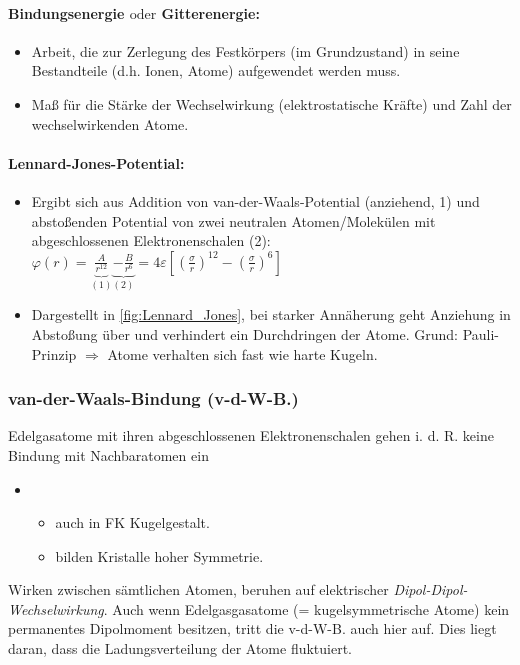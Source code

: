 \documentclass[a4paper,12pt]{article}
\begin{document}
\paragraph*{Bindungsenergie $\mathrm{oder}$ Gitterenergie:} \begin{itemize}
	\item Arbeit, die zur Zerlegung des Festkörpers (im Grundzustand) in seine Bestandteile (d.h. Ionen, Atome) aufgewendet werden muss. 
	\item Maß für die Stärke der Wechselwirkung (elektrostatische Kräfte) und Zahl der wechselwirkenden Atome.
\end{itemize}
\paragraph*{Lennard-Jones-Potential:} \begin{itemize}
	\item Ergibt sich aus Addition von van-der-Waals-Potential (anziehend, 1) und abstoßenden Potential von zwei neutralen Atomen/Molekülen mit abgeschlossenen Elektronenschalen (2): $ \varphi(r) = \underbrace{\frac{A}{r^{12}}}_{(1)} \underbrace{- \frac{B}{r^{6}}}_{(2)} = 4\varepsilon \left[\left(\frac{\sigma}{r}\right)^{12} - \left(\frac{\sigma}{r}\right)^6\right]$
	\item Dargestellt in \autoref{fig:Lennard_Jones}, bei starker Annäherung geht Anziehung in Abstoßung über und verhindert ein Durchdringen der Atome. Grund: Pauli-Prinzip $ \Rightarrow $ Atome verhalten sich fast wie harte Kugeln.
\end{itemize}
\subsubsection{van-der-Waals-Bindung (v-d-W-B.)}
Edelgasatome mit ihren abgeschlossenen Elektronenschalen gehen i. d. R. keine Bindung mit Nachbaratomen ein \begin{itemize}[label=]
	\item \begin{itemize}[label=$\Rightarrow$]
		\item auch in FK Kugelgestalt.
		\item bilden Kristalle hoher Symmetrie.
	\end{itemize}
\end{itemize}

Wirken zwischen sämtlichen Atomen, beruhen auf elektrischer \emph{Dipol-Dipol-Wechselwirkung}. Auch wenn Edelgasgasatome (= kugelsymmetrische Atome) kein permanentes Dipolmoment besitzen, tritt die v-d-W-B. auch hier auf. Dies liegt daran, dass die Ladungsverteilung der Atome fluktuiert.
\end{document}
